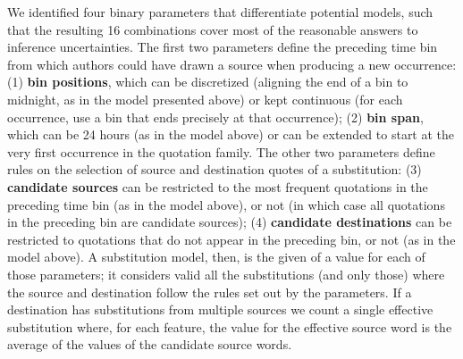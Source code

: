 \begin{new}

We identified four binary parameters that differentiate potential models, such that the resulting 16 combinations cover most of the reasonable answers to inference uncertainties.
The first two parameters define the preceding time bin from which authors could have drawn a source when producing a new occurrence:
(1) \textbf{bin positions}, which can be discretized (aligning the end of a bin to midnight, as in the model presented above) or kept continuous (for each occurrence, use a bin that ends precisely at that occurrence);
(2) \textbf{bin span}, which can be 24 hours (as in the model above) or can be extended to start at the very first occurrence in the quotation family.
The other two parameters define rules on the selection of source and destination quotes of a substitution:
(3) \textbf{candidate sources} can be restricted to the most frequent quotations in the preceding time bin (as in the model above), or not (in which case all quotations in the preceding bin are candidate sources);
(4) \textbf{candidate destinations} can be restricted to quotations that do not appear in the preceding bin, or not (as in the model above).
A substitution model, then, is the given of a value for each of those parameters;
it considers valid all the substitutions (and only those) where the source and destination follow the rules set out by the parameters.
If a destination has substitutions from multiple sources we count a single effective substitution where, for each feature, the value for the effective source word is the average of the values of the candidate source words.

\end{new}
